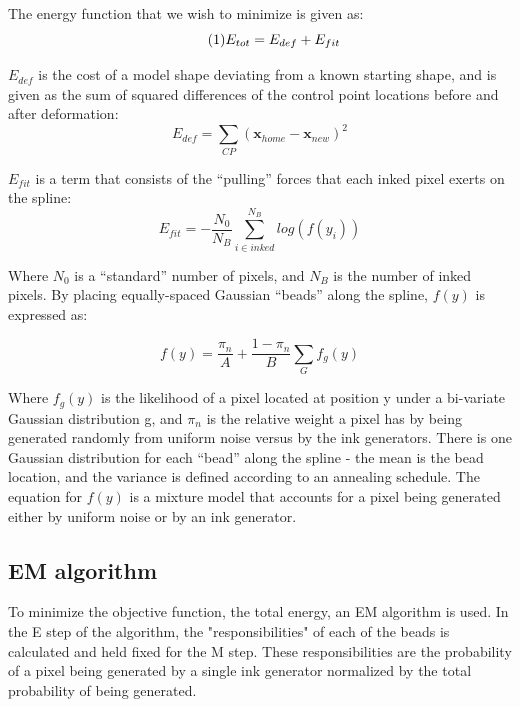 \documentclass[oribibl]{llncs}
\newcommand\numberthis{\addtocounter{equation}{1}\tag{\theequation}} %
\begin{document}
The energy function that we wish to minimize is given as:
\begin{equation*}
\numberthis \label{eq:E_total}
    E_{tot} = E_{def} + E_{fit}
\end{equation*}

$E_{def}$ is the cost of a model shape deviating from a known starting shape, and is given as the sum of squared differences of the control point locations before and after deformation:
$$ E_{def} =  \sum_{CP}{(\textbf{x}_{home} - \textbf{x}_{new})^2}$$ 

$E_{fit}$ is a term that consists of the ``pulling'' forces that each inked pixel exerts on the spline:
$$ E_{fit} = -\frac{N_0}{N_B}\sum_{i \in inked}^{N_B}{log(f(y_i))}  $$

Where $N_0$ is a ``standard'' number of pixels, and $N_B$ is the number of inked pixels.
By placing equally-spaced Gaussian ``beads'' along the spline, $f(y)$ is expressed as:

$$ f(y) =  \frac{\pi_n}{A} + \frac{1-\pi_n}{B}\sum_{G}{f_g(y)}$$ 

Where $f_g(y)$ is the likelihood of a pixel located at position y under a bi-variate Gaussian distribution g, and $\pi_n$ is the relative weight a pixel has by being generated randomly from uniform noise versus by the ink generators. 
There is one Gaussian distribution for each ``bead'' along the spline - the mean is the bead location, and the variance is defined according to an annealing schedule.
The equation for $f(y)$ is a mixture model that accounts for a pixel being generated either by uniform noise or by an ink generator.

\subsection{EM algorithm}
To minimize the objective function, the total energy, an EM algorithm is used. In the E step of the algorithm, the "responsibilities" of each of the beads is calculated and held fixed for the M step. These responsibilities are the probability of a pixel being generated by a single ink generator normalized by the total probability of being generated. 
\end{document}
